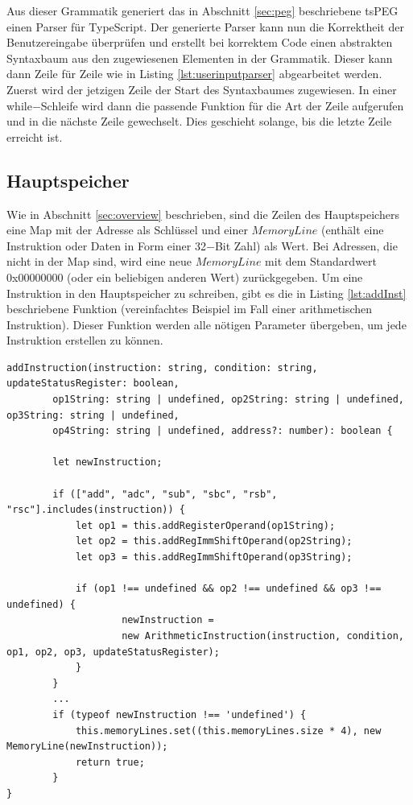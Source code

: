 \documentclass[a4paper, 11pt, onecolumn]{article}
\begin{document}
Aus dieser Grammatik generiert das in Abschnitt \ref{sec:peg} beschriebene tsPEG \cite{tspeg} einen Parser für TypeScript. Der generierte Parser kann nun die Korrektheit der Benutzereingabe überprüfen und erstellt bei korrektem Code einen abstrakten Syntaxbaum aus den zugewiesenen Elementen in der Grammatik. Dieser kann dann Zeile für Zeile wie in Listing \ref{lst:userinputparser} abgearbeitet werden. Zuerst wird der jetzigen Zeile der Start des Syntaxbaumes zugewiesen. In einer while$-$Schleife wird dann die passende Funktion für die Art der Zeile aufgerufen und in die nächste Zeile gewechselt. Dies geschieht solange, bis die letzte Zeile erreicht ist.\\

\subsection{Hauptspeicher}\label{sec:mainMemory}

Wie in Abschnitt \ref{sec:overview} beschrieben, sind die Zeilen des Hauptspeichers eine Map mit der Adresse als Schlüssel und einer $MemoryLine$ (enthält eine Instruktion oder Daten in Form einer 32$-$Bit Zahl) als Wert. Bei Adressen, die nicht in der Map sind, wird eine neue $MemoryLine$ mit dem Standardwert 0x00000000 (oder ein beliebigen anderen Wert) zurückgegeben. Um eine Instruktion in den Hauptspeicher zu schreiben, gibt es die in Listing \ref{lst:addInst} beschriebene Funktion (vereinfachtes Beispiel im Fall einer arithmetischen Instruktion). Dieser Funktion werden alle nötigen Parameter übergeben, um jede Instruktion erstellen zu können.


\begin{lstlisting}[style=JavaScript, basicstyle=\footnotesize, backgroundcolor=\color{backcolour}, caption={Hinzufügen einer Instruktion am Beispiel einer arithmetischen Instruktion}, captionpos=b, label={lst:addInst}]
addInstruction(instruction: string, condition: string, updateStatusRegister: boolean,
        op1String: string | undefined, op2String: string | undefined, op3String: string | undefined,
        op4String: string | undefined, address?: number): boolean {

        let newInstruction;

        if (["add", "adc", "sub", "sbc", "rsb", "rsc"].includes(instruction)) {
            let op1 = this.addRegisterOperand(op1String);
            let op2 = this.addRegImmShiftOperand(op2String);
            let op3 = this.addRegImmShiftOperand(op3String);

            if (op1 !== undefined && op2 !== undefined && op3 !== undefined) {
                    newInstruction =
                    new ArithmeticInstruction(instruction, condition, op1, op2, op3, updateStatusRegister);
            }
        }
        ...           
        if (typeof newInstruction !== 'undefined') {
            this.memoryLines.set((this.memoryLines.size * 4), new MemoryLine(newInstruction));
            return true;
        }   
}      	 
\end{lstlisting}
\end{document}

